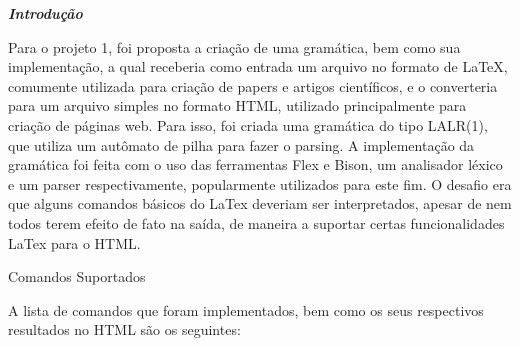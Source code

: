 \documentclass{article}
\begin{document}
\textbf{\textit{Introdução}}

Para o projeto 1, foi proposta a criação de uma gramática, bem como sua implementação, a qual receberia como entrada um arquivo no formato de LaTeX, comumente utilizada para criação de papers e artigos científicos, e o converteria para um arquivo simples no formato HTML, utilizado principalmente para criação de páginas web.
Para isso, foi criada uma gramática do tipo LALR(1), que utiliza um autômato de pilha para fazer o parsing. A implementação da gramática foi feita com o uso das ferramentas Flex e Bison, um analisador léxico e um parser respectivamente, popularmente utilizados para este fim. O desafio era que alguns comandos básicos do LaTex deveriam ser interpretados, apesar de nem todos terem efeito de fato na saída, de maneira a suportar certas funcionalidades LaTex para o HTML.

Comandos Suportados

A lista de comandos que foram implementados, bem como os seus respectivos resultados no HTML são os seguintes:
\end{document}
